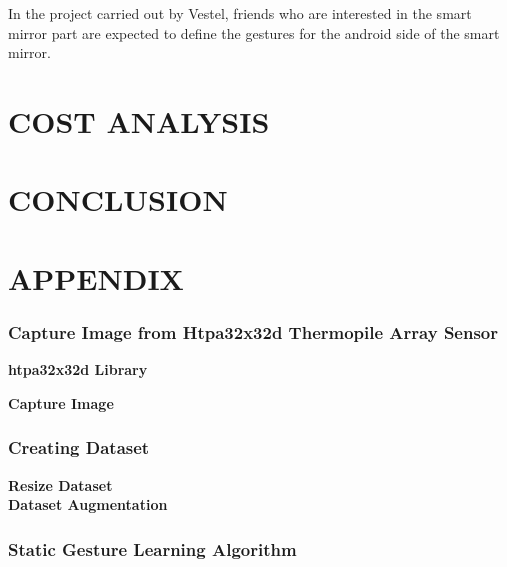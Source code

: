 \documentclass[thesis]{deutez}
\begin{document}
In the project carried out by Vestel, friends who are interested in the smart mirror part are expected to define the gestures for the android side of the smart mirror.

\chapter{COST ANALYSIS}
\chapter{CONCLUSION}
\chapter{APPENDIX}
\subsection{Capture Image from Htpa32x32d Thermopile Array Sensor}
\textbf{htpa32x32d Library}

\textbf{Capture Image}

\subsection{Creating Dataset }
\textbf{Resize Dataset}\\

\textbf{Dataset Augmentation}\\

\subsection{Static Gesture Learning Algorithm}


\end{document}
